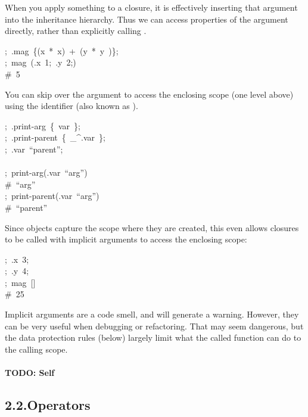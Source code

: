 \documentclass[preprint]{{acmart}}
\begin{document}
When you apply something to a closure, it is effectively inserting that
argument into the inheritance hierarchy.  Thus we can access properties
of the argument directly, rather than explicitly calling \mdcode{\_}.%
\begin{mdpre}%
\noindent;~.mag~\{(x~*~x)~+~(y~*~y~)\};\\
;~mag~(.x~1;~.y~2;)\\
{\#~5}%
\end{mdpre}\noindent{}You can skip over the argument to access the enclosing scope (one level above)
using the \mdcode{\_\textasciicircum{}} identifier (also known as ).
\begin{mdpre}%
\noindent;~.print-arg~\{~var~\};\\
;~.print-parent~\{~\_\textasciicircum{}.var~\};\\
;~.var~“parent”;\\
\\
;~print-arg(.var~“arg”)\\
{\#~“arg”}\\
;~print-parent(.var~“arg”)\\
{\#~“parent”}%
\end{mdpre}\noindent{}Since objects capture the scope where they are created, this even allows
closures to be called with implicit arguments to access the enclosing
scope:
\begin{mdpre}%
\noindent;~.x~3;\\
;~.y~4;\\
;~mag~{}[]\\
{\#~25}%
\end{mdpre}\noindent{}Implicit arguments are a code smell, and will generate a warning.
However, they can be very useful when debugging or refactoring. That may seem
dangerous, but the data protection rules (below) largely limit what the called
function can do to the calling scope.

\paragraph{TODO: Self}\label{sec-todo--self}%

\subsection{2.2.\hspace*{0.5em}Operators}\label{sec-operators}%
\end{document}
